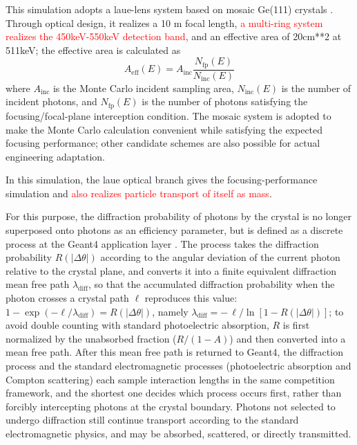 \documentclass[11pt]{article}
\begin{document}
This simulation adopts a laue-lens system based on mosaic Ge(111) crystals \cite{Barriere2009Laue,Barriere2011LauePrototype}. Through optical design, it realizes a 10 m focal length, \textcolor{red}{a multi-ring system realizes the 450keV-550keV detection band}, and an effective area of 20cm**2 at 511keV; the effective area is calculated as
\begin{equation}
  A_{\mathrm{eff}}(E)=A_{\mathrm{inc}}\frac{N_{\mathrm{fp}}(E)}{N_{\mathrm{inc}}(E)}
  \label{eq:laue_aeff}
\end{equation}
where $A_{\mathrm{inc}}$ is the Monte Carlo incident sampling area, $N_{\mathrm{inc}}(E)$ is the number of incident photons, and $N_{\mathrm{fp}}(E)$ is the number of photons satisfying the focusing/focal-plane interception condition.
The mosaic system is adopted to make the Monte Carlo calculation convenient while satisfying the expected focusing performance; other candidate schemes are also possible for actual engineering adaptation.

In this simulation, the laue optical branch gives the focusing-performance simulation and \textcolor{red}{also realizes particle transport of itself as mass}.

For this purpose, the diffraction probability of photons by the crystal is no longer superposed onto photons as an efficiency parameter, but is defined as a discrete process at the Geant4 application layer \cite{Agostinelli2003,Allison2016}. The process takes the diffraction probability $R(|\Delta\theta|)$ according to the angular deviation of the current photon relative to the crystal plane, and converts it into a finite equivalent diffraction mean free path $\lambda_{\mathrm{diff}}$, so that the accumulated diffraction probability when the photon crosses a crystal path $\ell$ reproduces this value: $1-\exp(-\ell/\lambda_{\mathrm{diff}})=R(|\Delta\theta|)$, namely $\lambda_{\mathrm{diff}}=-\,\ell/\ln[1-R(|\Delta\theta|)]$; to avoid double counting with standard photoelectric absorption, $R$ is first normalized by the unabsorbed fraction ($R/(1-A)$) and then converted into a mean free path. After this mean free path is returned to Geant4, the diffraction process and the standard electromagnetic processes (photoelectric absorption and Compton scattering) each sample interaction lengths in the same competition framework, and the shortest one decides which process occurs first, rather than forcibly intercepting photons at the crystal boundary. Photons not selected to undergo diffraction still continue transport according to the standard electromagnetic physics, and may be absorbed, scattered, or directly transmitted.
\end{document}
